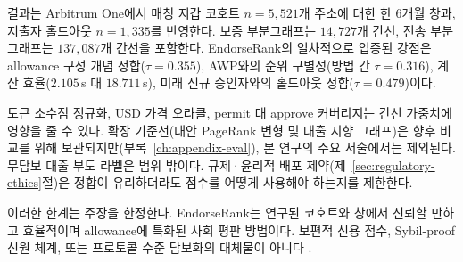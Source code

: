 
결과는 Arbitrum One에서 매칭 지갑 코호트 $n=5{,}521$개 주소에 대한 한 6개월 창과, 지출자 홀드아웃 $n=1{,}335$를 반영한다. 보증 부분그래프는 $14{,}727$개 간선, 전송 부분그래프는 $137{,}087$개 간선을 포함한다. EndorseRank의 일차적으로 입증된 강점은 allowance 구성 개념 정합($\tau=0.355$), AWP와의 순위 구별성(방법 간 $\tau=0.316$), 계산 효율($2.105$\,s 대 $18.711$\,s), 미래 신규 승인자와의 홀드아웃 정합($\tau=0.479$)이다.

토큰 소수점 정규화, USD 가격 오라클, permit 대 approve 커버리지는 간선 가중치에 영향을 줄 수 있다. 확장 기준선(대안 PageRank 변형 및 대출 지향 그래프)은 향후 비교를 위해 보관되지만(부록~\ref{ch:appendix-eval}), 본 연구의 주요 서술에서는 제외된다. 무담보 대출 부도 라벨은 범위 밖이다. 규제·윤리적 배포 제약(제~\ref{sec:regulatory-ethics}절)은 정합이 유리하더라도 점수를 어떻게 사용해야 하는지를 제한한다.

이러한 한계는 주장을 한정한다. EndorseRank는 연구된 코호트와 창에서 신뢰할 만하고 효율적이며 allowance에 특화된 사회 평판 방법이다. 보편적 신용 점수, Sybil-proof 신원 체계, 또는 프로토콜 수준 담보화의 대체물이 아니다 .
